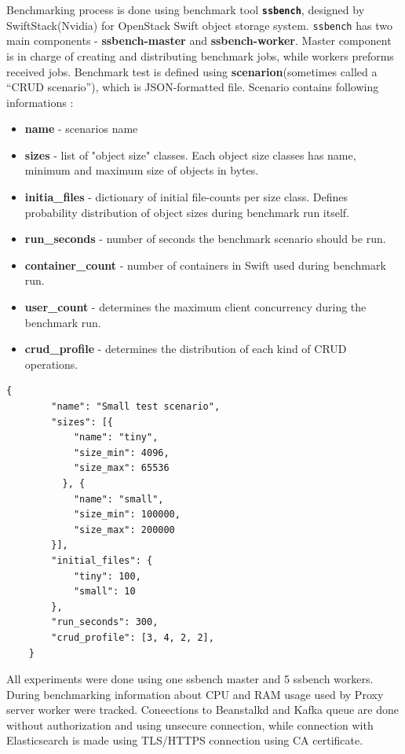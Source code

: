     Benchmarking process is done using benchmark tool \textbf{\texttt{ssbench}}, designed by SwiftStack(Nvidia) for OpenStack Swift object storage system. \texttt{ssbench} has two main components - \textbf{ssbench-master} and \textbf{ssbench-worker}. Master component is in charge of creating and distributing benchmark jobs, while workers preforms received jobs. Benchmark test is defined using \textbf{scenarion}(sometimes called a “CRUD scenario”), which is JSON-formatted file. Scenario contains following informations \cite{swiftSsbench}:
    \begin{itemize}
        \item \textbf{name} - scenarios name
        \item \textbf{sizes} - list of "object size" classes. Each object size classes has name, minimum and maximum size of objects in bytes.
        \item \textbf{initia\_files} - dictionary of initial file-counts per size class. Defines probability distribution of object sizes during benchmark run itself.
        \item \textbf{run\_seconds} - number of seconds the benchmark scenario should be run.
        \item \textbf{container\_count} - number of containers in Swift used during benchmark run.
        \item \textbf{user\_count} - determines the maximum client concurrency during the benchmark run.
        \item \textbf{crud\_profile} - determines the distribution of each kind of CRUD operations.
    \end{itemize}

    \begin{lstlisting}[style=jsonStyle, caption=Example ssbench scenario.]
    {
        "name": "Small test scenario",
        "sizes": [{
            "name": "tiny",
            "size_min": 4096,
            "size_max": 65536
          }, {
            "name": "small",
            "size_min": 100000,
            "size_max": 200000
        }],
        "initial_files": {
            "tiny": 100,
            "small": 10
        },
        "run_seconds": 300,
        "crud_profile": [3, 4, 2, 2],
    }
    \end{lstlisting}

    All experiments were done using one ssbench master and 5 ssbench workers. During benchmarking information about CPU and RAM usage used by Proxy server worker were tracked. Coneections to Beanstalkd and Kafka queue are done without authorization and using unsecure connection, while connection with Elasticsearch is made using TLS/HTTPS connection using CA certificate.

